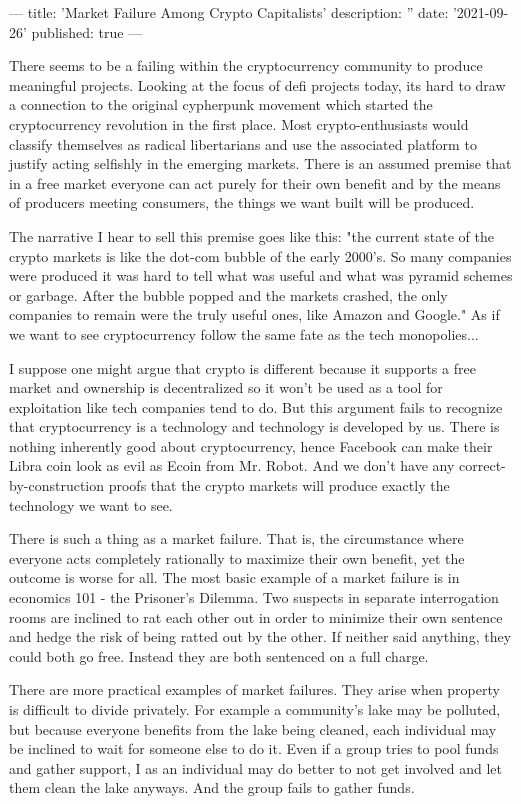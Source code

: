 ---
title: 'Market Failure Among Crypto Capitalists'
description: ''
date: '2021-09-26'
published: true
---

There seems to be a failing within the cryptocurrency community to produce meaningful projects. Looking at the focus of defi projects today, its hard to draw a connection to the original cypherpunk movement which started the cryptocurrency revolution in the first place. Most crypto-enthusiasts would classify themselves as radical libertarians and use the associated platform to justify acting selfishly in the emerging markets. There is an assumed premise that in a free market everyone can act purely for their own benefit and by the means of producers meeting consumers, the things we want built will be produced.

The narrative I hear to sell this premise goes like this: "the current state of the crypto markets is like the dot-com bubble of the early 2000's. So many companies were produced it was hard to tell what was useful and what was pyramid schemes or garbage. After the bubble popped and the markets crashed, the only companies to remain were the truly useful ones, like Amazon and Google." As if we want to see cryptocurrency follow the same fate as the tech monopolies...

I suppose one might argue that crypto is different because it supports a free market and ownership is decentralized so it won't be used as a tool for exploitation like tech companies tend to do. But this argument fails to recognize that cryptocurrency is a technology and technology is developed by us. There is nothing inherently good about cryptocurrency, hence Facebook can make their Libra coin look as evil as Ecoin from Mr. Robot. And we don't have any correct-by-construction proofs that the crypto markets will produce exactly the technology we want to see.

There is such a thing as a market failure. That is, the circumstance where everyone acts completely rationally to maximize their own benefit, yet the outcome is worse for all. The most basic example of a market failure is in economics 101 - the Prisoner's Dilemma. Two suspects in separate interrogation rooms are inclined to rat each other out in order to minimize their own sentence and hedge the risk of being ratted out by the other. If neither said anything, they could both go free. Instead they are both sentenced on a full charge.

There are more practical examples of market failures. They arise when property is difficult to divide privately. For example a community's lake may be polluted, but because everyone benefits from the lake being cleaned, each individual may be inclined to wait for someone else to do it. Even if a group tries to pool funds and gather support, I as an individual may do better to not get involved and let them clean the lake anyways. And the group fails to gather funds.

